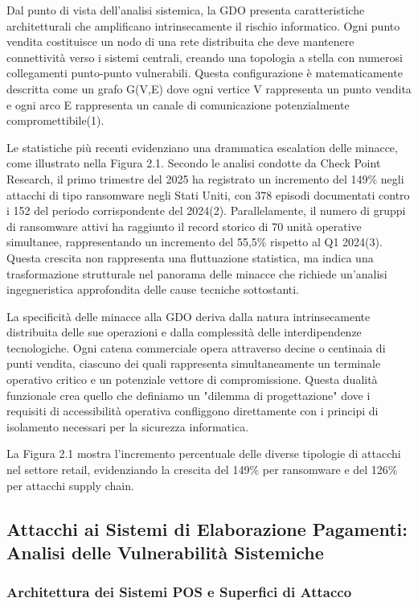 \documentclass[12pt,a4paper,oneside]{book}
\begin{document}
Dal punto di vista dell'analisi sistemica, la GDO presenta caratteristiche architetturali che amplificano intrinsecamente il rischio informatico. Ogni punto vendita costituisce un nodo di una rete distribuita che deve mantenere connettività verso i sistemi centrali, creando una topologia a stella con numerosi collegamenti punto-punto vulnerabili. Questa configurazione è matematicamente descritta come un grafo G(V,E) dove ogni vertice V rappresenta un punto vendita e ogni arco E rappresenta un canale di comunicazione potenzialmente compromettibile(1).

Le statistiche più recenti evidenziano una drammatica escalation delle minacce, come illustrato nella Figura 2.1. Secondo le analisi condotte da Check Point Research, il primo trimestre del 2025 ha registrato un incremento del 149\% negli attacchi di tipo ransomware negli Stati Uniti, con 378 episodi documentati contro i 152 del periodo corrispondente del 2024(2). Parallelamente, il numero di gruppi di ransomware attivi ha raggiunto il record storico di 70 unità operative simultanee, rappresentando un incremento del 55,5\% rispetto al Q1 2024(3). Questa crescita non rappresenta una fluttuazione statistica, ma indica una trasformazione strutturale nel panorama delle minacce che richiede un'analisi ingegneristica approfondita delle cause tecniche sottostanti.

La specificità delle minacce alla GDO deriva dalla natura intrinsecamente distribuita delle sue operazioni e dalla complessità delle interdipendenze tecnologiche. Ogni catena commerciale opera attraverso decine o centinaia di punti vendita, ciascuno dei quali rappresenta simultaneamente un terminale operativo critico e un potenziale vettore di compromissione. Questa dualità funzionale crea quello che definiamo un "dilemma di progettazione" dove i requisiti di accessibilità operativa confliggono direttamente con i principi di isolamento necessari per la sicurezza informatica.

La Figura 2.1 mostra l'incremento percentuale delle diverse tipologie di attacchi nel settore retail, evidenziando la crescita del 149\% per ransomware e del 126\% per attacchi supply chain.

\subsection{Attacchi ai Sistemi di Elaborazione Pagamenti: Analisi delle Vulnerabilità Sistemiche}

\subsubsection{Architettura dei Sistemi POS e Superfici di Attacco}
\end{document}

